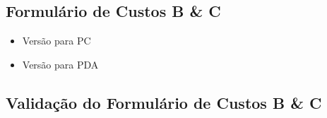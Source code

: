 \subsection{Formulário de Custos B \& C}
\label{sec:alvos_custos_bc}

\begin{itemize}

\item Versão para PC

\item Versão para PDA

\end{itemize}

\subsection{Validação do Formulário de Custos B \& C}
\label{sec:validacao_custos_bc}

